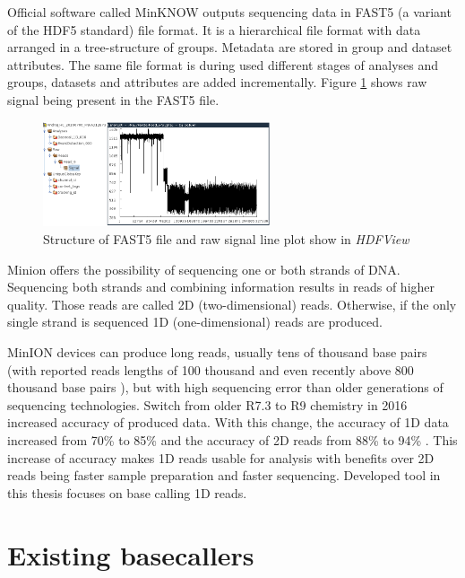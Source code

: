 \documentclass[times, utf8, diplomski, numeric, english]{fer}
\begin{document}
Official software called MinKNOW outputs sequencing data in FAST5 (a variant of the HDF5 standard) file format. It is a hierarchical file format with data arranged in a tree-structure of groups. Metadata are stored in group and dataset attributes. The same file format is during used different stages of analyses and groups, datasets and attributes are added incrementally. Figure \ref{fg:fast5} shows raw signal being present in the FAST5 file.
\begin{figure}[!ht]
	\begin{center}
		\includegraphics[width=0.6\textwidth]{./imgs/fast5.png}
		\caption[Structure of FAST5 file and raw signal plot show in \textit{HDFView}]{Structure of FAST5 file and raw signal line plot show in \textit{HDFView} \protect\footnotemark}
		\label{fg:fast5}
	\end{center}
\end{figure}

Minion offers the possibility of sequencing one or both strands of DNA. Sequencing both strands and combining information results in reads of higher quality. Those reads are called 2D (two-dimensional) reads. Otherwise, if the only single strand is sequenced 1D (one-dimensional) reads are produced.

MinION devices can produce long reads, usually tens of thousand base pairs (with reported reads lengths of 100 thousand \cite{loman1-100k} and even recently above 800 thousand base pairs \cite{loman2-800k}), but with high sequencing error than older generations of sequencing technologies.
Switch from older R7.3 to  R9 chemistry in 2016 increased accuracy of produced data. With this change, the accuracy of 1D data increased from 70\% to 85\% and the accuracy of 2D reads from 88\% to 94\% \cite{nanopore_video}.  This increase of accuracy makes 1D reads usable for analysis with benefits over 2D reads being faster sample preparation and faster sequencing. Developed tool in this thesis focuses on base calling 1D reads.


  
\section{Existing basecallers}
\end{document}
